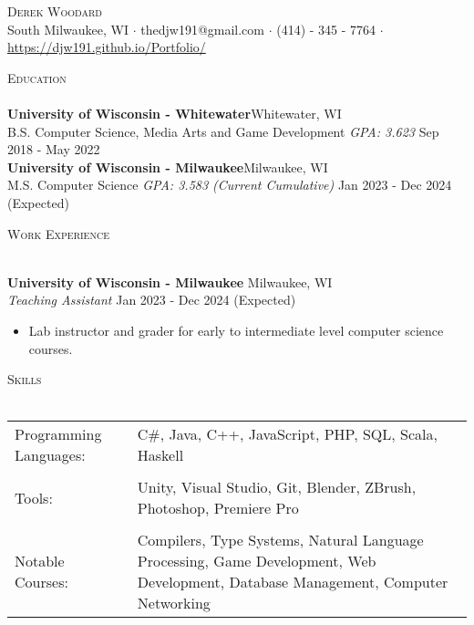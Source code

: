 \documentclass[letter, 12pt]{article}
\newcommand{\lineunder} {
    \vspace*{-8pt} \\
    \hspace*{-18pt} \hrulefill \\
}
\newcommand{\header} [1] {
    {\hspace*{-18pt}\vspace*{6pt} \textsc{#1}}
    \vspace*{-6pt} \lineunder
}
\begin{document}
\vspace*{-40pt}

    

\vspace*{-10pt}
\begin{center}
	{\Huge \scshape {Derek Woodard}}\\
	\vspace{5mm}	
	South Milwaukee, WI $\cdot$ thedjw191@gmail.com $\cdot$ (414) - 345 - 7764 $\cdot$ \url{https://djw191.github.io/Portfolio/}\\
\end{center}

\header{Education}
\textbf{University of Wisconsin - Whitewater}\hfill Whitewater, WI\\
B.S. Computer Science, Media Arts and Game Development \textit{GPA: 3.623} \hfill Sep 2018 - May 2022\\
\vspace{2mm}
\textbf{University of Wisconsin - Milwaukee}\hfill Milwaukee, WI\\
M.S. Computer Science \textit{GPA: 3.583 (Current Cumulative)} \hfill Jan 2023 - Dec 2024 (Expected)\\
\vspace{2mm}

\header{Work Experience}
\vspace{1mm}

\textbf{University of Wisconsin - Milwaukee} \hfill Milwaukee, WI\\
\textit{Teaching Assistant} \hfill Jan 2023 - Dec 2024 (Expected)\\
\vspace{-1mm}
\begin{itemize} \itemsep 1pt
	\item Lab instructor and grader for early to intermediate level computer science courses.
\end{itemize}

\header{Skills}
\begin{tabular}{p{2in}p{4.25in}}
	Programming Languages: & C\#, Java, C++, JavaScript, PHP, SQL, Scala, Haskell                                                                                                                            \\
\\
	Tools:                 & Unity, Visual Studio, Git, Blender, ZBrush, Photoshop, Premiere Pro                                                                                                             \\
\\
	Notable Courses:      & Compilers, Type Systems, Natural Language Processing, Game Development, Web Development, Database Management, Computer Networking \\
\end{tabular}
\vspace{2mm}
\end{document}
